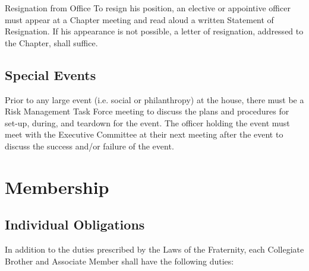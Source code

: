 \documentclass{article}
\begin{document}
\begin{subsubsectionList}
  \item {\titleStyle Resignation from Office\titleSuffix}
  To resign his position, an elective or appointive officer must appear at a
  Chapter meeting and read aloud a written Statement of Resignation. If his
  appearance is not possible, a letter of resignation, addressed to the Chapter,
  shall suffice.
\end{subsubsectionList}

\subsection{Special Events}

Prior to any large event (i.e. social or philanthropy) at the house, there must
be a Risk Management Task Force meeting to discuss the plans and procedures for
set-up, during, and teardown for the event. The officer holding the event must
meet with the Executive Committee at their next meeting after the event to
discuss the success and/or failure of the event.

\section{Membership}

\subsection{Individual Obligations}\label{Individual Obligations}

In addition to the duties  prescribed by the Laws of the Fraternity, each Collegiate
Brother and Associate Member shall have the following duties:

\newcommand*\minimumGradePointAverage{2.5}
\end{document}
